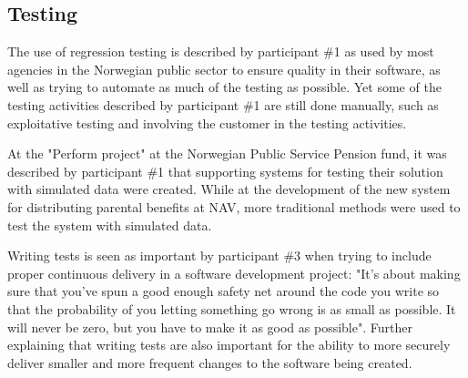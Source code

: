 
\subsection{Testing} \label{sec:testing}
The use of regression testing is described by participant \#1 as used by most agencies in the Norwegian public sector to ensure quality in their software, as well as trying to automate as much of the testing as possible. Yet some of the testing activities described by participant \#1 are still done manually, such as exploitative testing and involving the customer in the testing activities.


At the "Perform project" at the Norwegian Public Service Pension fund, it was described by participant \#1 that supporting systems for testing their solution with simulated data were created. While at the development of the new system for distributing parental benefits at NAV, more traditional methods were used to test the system with simulated data.


Writing tests is seen as important by participant \#3 when trying to include proper continuous delivery in a software development project: "It's about making sure that you've spun a good enough safety net around the code you write so that the probability of you letting something go wrong is as small as possible. It will never be zero, but you have to make it as good as possible". Further explaining that writing tests are also important for the ability to more securely deliver smaller and more frequent changes to the software being created.

